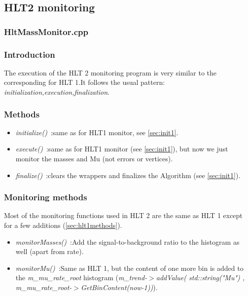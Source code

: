 \subsection{\textbf{HLT2 monitoring}}

\subsubsection{\textbf{HltMassMonitor.cpp}}
\subsubsection{\textbf{Introduction}}
The execution of the HLT 2 monitoring program is very similar to the corresponding for HLT 1.It follows the usual pattern: \textit{initialization,execution,finalization}.

\subsubsection{\textbf{Methods}}

\begin{itemize}
\item \textit{initialize()}~:same as for HLT1 monitor, see \ref{sec:init1}.
\item \textit{execute()}~:same as for HLT1 monitor (see \ref{sec:init1}), but now we just monitor the masses and Mu (not errors or vertices).\par
\item \textit{finalize()}~:clears the wrappers and finalizes the Algorithm  (see \ref{sec:init1}).\par

\end{itemize}

\subsubsection{\textbf{Monitoring methods}}
Most of the monitoring functions used in HLT 2 are the same as HLT 1 except for a few additions (\ref{sec:hlt1methods}).\par

\begin{itemize}

\item \textit{monitorMasses()}~:Add the signal-to-background ratio to the histogram as well (apart from rate).\par
\item \textit{monitorMu()}~:Same as HLT 1, but the content of one more bin is added to the \textit{m\_mu\_rate\_root} histogram (\textit{m\_trend-$>$addValue( std::string("Mu") , m\_mu\_rate\_root-$>$GetBinContent(now-1))}).\par

\end{itemize}

